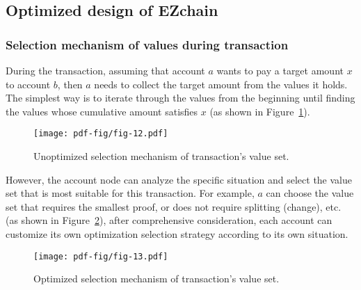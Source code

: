 \documentclass[conference]{IEEEtran}
\begin{document}
\subsection{Optimized design of EZchain}
\label{subsec: Optimized design}

\subsubsection{Selection mechanism of values during transaction}
\label{subsubsec: Selection mechanism of values}
During the transaction, assuming that account $a$ wants to pay a target amount $x$ to account $b$, then $a$ needs to collect the target amount from the values it holds. The simplest way is to iterate through the values from the beginning until finding the values whose cumulative amount satisfies $x$ (as shown in Figure~\ref{fig: unoptimized selection plan}).
\begin{figure}[htp!]
    \centering
    \texttt{[image: pdf-fig/fig-12.pdf]}
    \caption{Unoptimized selection mechanism of transaction's value set.}
    \label{fig: unoptimized selection plan}
\end{figure}

However, the account node can analyze the specific situation and select the value set that is most suitable for this transaction. For example, $a$ can choose the value set that requires the smallest proof, or does not require splitting (change), etc. (as shown in Figure~\ref{fig: optimized selection plan}), after comprehensive consideration, each account can customize its own optimization selection strategy according to its own situation.
\begin{figure}[htp!]
    \centering
    \texttt{[image: pdf-fig/fig-13.pdf]}
    \caption{Optimized selection mechanism of transaction's value set.}
    \label{fig: optimized selection plan}
\end{figure}
\end{document}
